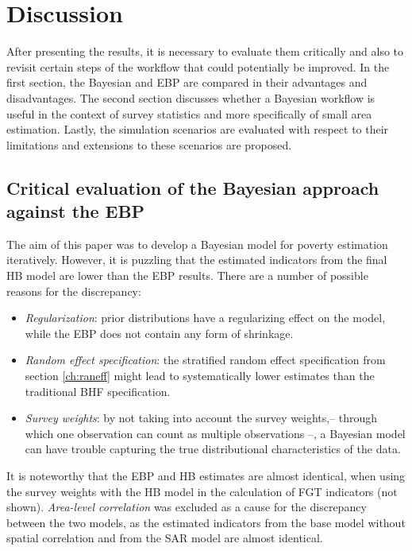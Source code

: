 \chapter{Discussion}

After presenting the results, it is necessary to evaluate them critically and also to revisit certain steps of the workflow that could potentially be improved.
In the first section, the Bayesian and EBP are compared in their advantages and disadvantages.
The second section discusses whether a Bayesian workflow is useful in the context of survey statistics and more specifically of small area estimation.
Lastly, the simulation scenarios are evaluated with respect to their limitations and extensions to these scenarios are proposed.


\section{Critical evaluation of the Bayesian approach against the EBP}

The aim of this paper was to develop a Bayesian model for poverty estimation iteratively.
However, it is puzzling that the estimated indicators from the final HB model are lower than the EBP results.
There are a number of possible reasons for the discrepancy:
\begin{itemize}
    \item \textit{Regularization}: prior distributions have a regularizing effect on the model, while the EBP does not contain any form of shrinkage.
    \item \textit{Random effect specification}: the stratified random effect specification from section \ref{ch:raneff} might lead to systematically lower estimates than the traditional BHF specification.
    \item \textit{Survey weights}: by not taking into account the survey weights,– through which one observation can count as multiple observations –, a Bayesian model can have trouble capturing the true distributional characteristics of the data.
\end{itemize}
It is noteworthy that the EBP and HB estimates are almost identical, when using the survey weights with the HB model in the calculation of FGT indicators (not shown).
\textit{Area-level correlation} was excluded as a cause for the discrepancy between the two models, as the estimated indicators from the base model without spatial correlation and from the SAR model are almost identical.

